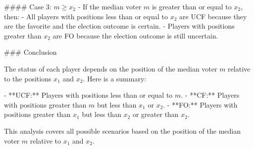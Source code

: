 #### Case 3: \( m \geq x_2 \)
- If the median voter \( m \) is greater than or equal to \( x_2 \), then:
  - All players with positions less than or equal to \( x_2 \) are UCF because they are the favorite and the election outcome is certain.
  - Players with positions greater than \( x_2 \) are FO because the election outcome is still uncertain.

### Conclusion

The status of each player depends on the position of the median voter \( m \) relative to the positions \( x_1 \) and \( x_2 \). Here is a summary:

- **UCF:** Players with positions less than or equal to \( m \).
- **CF:** Players with positions greater than \( m \) but less than \( x_1 \) or \( x_2 \).
- **FO:** Players with positions greater than \( x_1 \) but less than \( x_2 \) or greater than \( x_2 \).

This analysis covers all possible scenarios based on the position of the median voter \( m \) relative to \( x_1 \) and \( x_2 \).